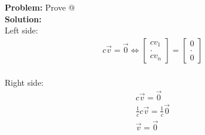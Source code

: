 \documentclass[11pt]{article}
\makeatletter
\theoremstyle{plain}
\theoremstyle{remark}
\theoremstyle{plain}
\newcommand{\bd}{\textbf}
\newcommand*{\rom}[1]{\expandafter\@slowromancap\romannumeral #1@}
\makeatother
\begin{document}
\begin{tcolorbox}[colback=magenta!5!white,colframe = magenta!75!black,title=Example]
    \bd{Problem:} Prove \rom{11} \\

    \bd{Solution:} \\

    Left side:
    \begin{align*}
        c\overrightarrow{v} = \overrightarrow{0} \iff \begin{bmatrix}
            cv_1 \\ . \\cv_n
        \end{bmatrix} =  \begin{bmatrix}
            0 \\ . \\0
        \end{bmatrix} \\
    \end{align*}

    Right side:
    \begin{align*}
        c\overrightarrow{v} = \overrightarrow{0} \\
        \frac{1}{c}c\overrightarrow{v} = \frac{1}{c}\overrightarrow{0} \\
        \overrightarrow{v} = \overrightarrow{0} \\
    \end{align*}

\end{tcolorbox}   
\end{document}
